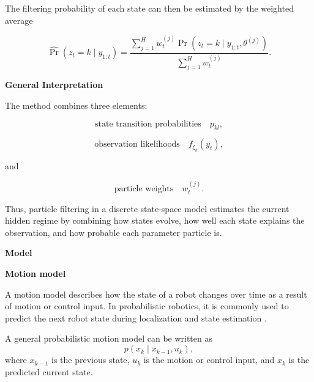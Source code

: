 \documentclass{book}
\providecommand{\ProjectDeepHeading}[2]{%
    \par\medskip\noindent\textbf{#2}\par\smallskip
}
\begin{document}
        The filtering probability of each state can then be estimated by the weighted average
        
        \[
            \widehat{\Pr}
            \left(
                z_t = k
                \mid
                y_{1:t}
            \right)
            =
            \frac{
                \sum_{j=1}^{H}
                w_t^{(j)}
                \Pr
                \left(
                    z_t = k
                    \mid
                    y_{1:t},
                    \ensuremath{\theta}^{(j)}
                \right)
            }{
                \sum_{j=1}^{H}
                w_t^{(j)}
            }.
        \]
    
    
    \ProjectDeepHeading{12}{General Interpretation}
        
        The method combines three elements:
        
        \[
            \text{state transition probabilities}
            \quad
            p_{kl},
        \]
        
        \[
            \text{observation likelihoods}
            \quad
            f_{\ensuremath{\xi}_k}(y_t),
        \]
        
        and
        
        \[
            \text{particle weights}
            \quad
            w_t^{(j)}.
        \]
        
        Thus, particle filtering in a discrete state-space model estimates the current hidden regime by combining how states evolve, how well each state explains the observation, and how probable each parameter particle is.

\ProjectDeepHeading{6}{Model}

\ProjectDeepHeading{7}{Motion model}


A motion model describes how the state of a robot changes over time as a result of motion or control input. In probabilistic robotics, it is commonly used to predict the next robot state during localization and state estimation \cite{thrun-2005-probabilistic-robotics}.

   A general probabilistic motion model can be written as
   \[
      p(x_k \mid x_{k-1},u_k),
   \]
   where $x_{k-1}$ is the previous state, $u_k$ is the motion or control input, and $x_k$ is the predicted current state.
\end{document}
